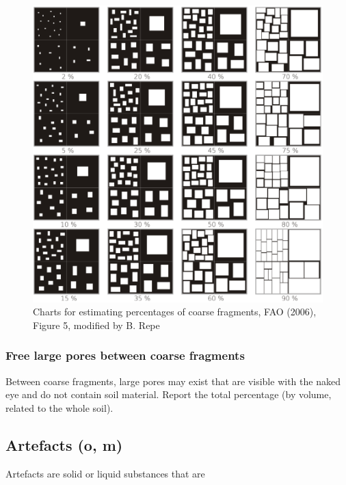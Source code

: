 \documentclass[
  letterpaper,
  DIV=11,
  numbers=noendperiod]{scrreprt}
\begin{document}
\begin{figure}

{\centering \includegraphics{./figure_8-12.png}

}

\caption{Charts for estimating percentages of coarse fragments, FAO
(2006), Figure 5, modified by B. Repe}

\end{figure}

\hypertarget{free-large-pores-between-coarse-fragments}{%
\subsubsection{Free large pores between coarse
fragments}\label{free-large-pores-between-coarse-fragments}}

Between coarse fragments, large pores may exist that are visible with
the naked eye and do not contain soil material. Report the total
percentage (by volume, related to the whole soil).

\hypertarget{artefacts-o-m}{%
\subsection{Artefacts (o, m)}\label{artefacts-o-m}}

Artefacts are solid or liquid substances that are
\end{document}
